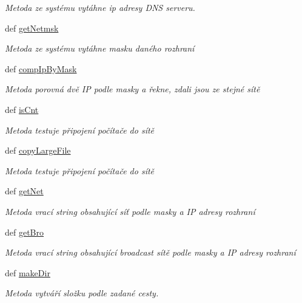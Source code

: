 \begin{DoxyCompactItemize}
\begin{DoxyCompactList}\small\item\em Metoda ze systému vytáhne ip adresy D\-N\-S serveru. \end{DoxyCompactList}\item 
def \hyperlink{classConsSys_1_1ConsSys_a73714b34e9344c67d2a9328f270376aa}{get\-Netmsk}
\begin{DoxyCompactList}\small\item\em Metoda ze systému vytáhne masku daného rozhraní \end{DoxyCompactList}\item 
def \hyperlink{classConsSys_1_1ConsSys_a1ef224020294732e42b40e7ee5664d34}{comp\-Ip\-By\-Mask}
\begin{DoxyCompactList}\small\item\em Metoda porovná dvě I\-P podle masky a řekne, zdali jsou ze stejné sítě \end{DoxyCompactList}\item 
def \hyperlink{classConsSys_1_1ConsSys_ab9af30415a18ef366860ab040eacb8e8}{is\-Cnt}
\begin{DoxyCompactList}\small\item\em Metoda testuje připojení počítače do sítě \end{DoxyCompactList}\item 
def \hyperlink{classConsSys_1_1ConsSys_a32297a919cf09725c56828a6769cff70}{copy\-Large\-File}
\begin{DoxyCompactList}\small\item\em Metoda testuje připojení počítače do sítě \end{DoxyCompactList}\item 
def \hyperlink{classConsSys_1_1ConsSys_ac263a75aea172529aaab896910868f8b}{get\-Net}
\begin{DoxyCompactList}\small\item\em Metoda vrací string obsahující síť podle masky a I\-P adresy rozhraní \end{DoxyCompactList}\item 
def \hyperlink{classConsSys_1_1ConsSys_a93f04ba291edd339f34874dacb13fa9e}{get\-Bro}
\begin{DoxyCompactList}\small\item\em Metoda vrací string obsahující broadcast sítě podle masky a I\-P adresy rozhraní \end{DoxyCompactList}\item 
def \hyperlink{classConsSys_1_1ConsSys_a5cce3cec792a5c429af36432c8dc5110}{make\-Dir}
\begin{DoxyCompactList}\small\item\em Metoda vytváří složku podle zadané cesty. \end{DoxyCompactList}\item 

\end{DoxyCompactItemize}
